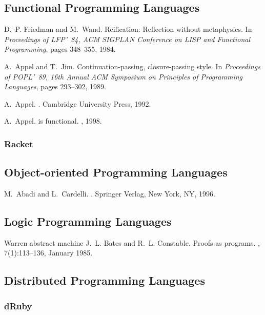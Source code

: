 \documentclass{myproc}
\begin{document}
\subsection{Functional Programming Languages}
\bit
\w D.~P. Friedman and M.~Wand.
\newblock Reification: Reflection without metaphysics.
\newblock In {\em Proceedings of LFP'~84, ACM SIGPLAN Conference on LISP and
  Functional Programming}, pages 348--355, 1984.

\w A.~Appel and T.~Jim.
\newblock Continuation-passing, closure-passing style.
\newblock In {\em Proceedings of POPL'~89, 16th Annual ACM Symposium on
  Principles of Programming Languages}, pages 293--302, 1989.

\w A.~Appel.
.
\newblock Cambridge University Press, 1992.

\w A.~Appel.
 is functional.
, 1998.
\eit

\subsubsection{Racket}

\subsection{Object-oriented Programming Languages}
\bit
\w M.~Abadi and L.~Cardelli.
.
\newblock Springer Verlag, New York, NY, 1996.

\eit

\subsection{Logic Programming Languages}
\bit
\w Warren abstract machine
\w J.~L. Bates and R.~L. Constable.
\newblock Proofs as programs.
,
  7(1):113--136, January 1985.
\eit

\subsection{Distributed Programming Languages}
\subsubsection{dRuby}
\end{document}
